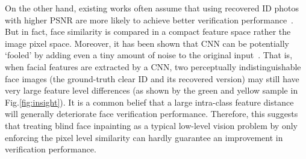 \documentclass[10pt,twocolumn,letterpaper]{article}
\begin{document}





On the other hand, existing works often assume that using recovered ID photos with higher PSNR are more likely to achieve better verification performance~\cite{7550058}. But in fact, face similarity is compared in a compact feature space rather the image pixel space. Moreover, it has been shown that CNN can be potentially `fooled' by adding even a tiny amount of noise to the original input~\cite{goodfellow2014explaining,nguyen2015deep,szegedy2013intriguing}. That is, when facial features are extracted by a CNN, two perceptually indistinguishable face images (\eg the ground-truth clear ID and its recovered version) may still have very large feature level differences (as shown by the green and yellow sample in Fig.\ref{fig:insight}). It is a common belief that a large intra-class feature distance will generally deteriorate face verification performance. Therefore, this suggests that treating blind face inpainting as a typical low-level vision problem by only enforcing the pixel level similarity can hardly guarantee an improvement in verification performance.


\end{document}
